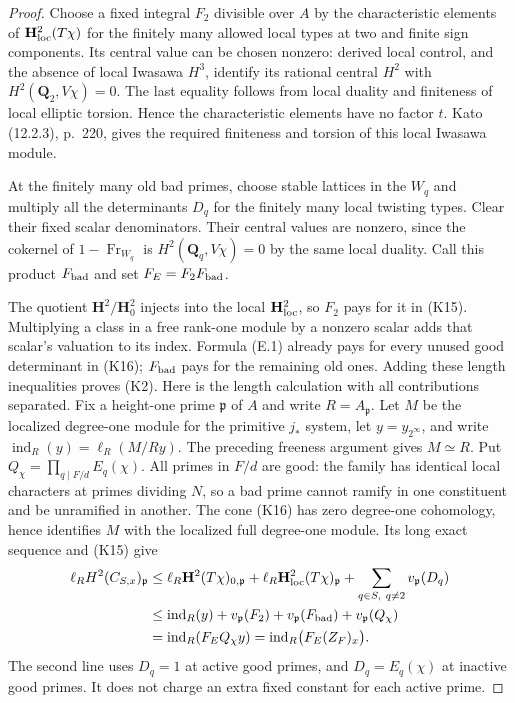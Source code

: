 \begin{proof}
Choose a fixed integral $F_2$ divisible over $A$ by the
characteristic elements of $\mathbf H^2_{\rm loc}(T\chi)$
for the finitely many allowed local types at two and finite
sign components. Its central value can be chosen nonzero:
derived local control, and the absence of local Iwasawa $H^3$,
identify its rational central $H^2$ with $H^2(\mathbf Q_2,V\chi)=0$.
The last equality follows from local duality and finiteness of
local elliptic torsion. Hence the characteristic elements have
no factor $t$. Kato (12.2.3), p.~220, gives the required finiteness
and torsion of this local Iwasawa module.

At the finitely many old bad primes, choose stable lattices in
the $W_q$ and multiply all the determinants $D_q$ for the finitely
many local twisting types. Clear their fixed scalar denominators.
Their central values are nonzero, since the cokernel of
$1-\operatorname{Fr}_{W_q}$ is $H^2(\mathbf Q_q,V\chi)=0$
by the same local duality. Call this product $F_{\rm bad}$ and set
$F_E=F_2F_{\rm bad}$.

The quotient $\mathbf H^2/\mathbf H^2_0$ injects into the local
$\mathbf H^2_{\rm loc}$, so $F_2$ pays for it in (K15).
Multiplying a class in a free rank-one module by a nonzero scalar
adds that scalar's valuation to its index. Formula (E.1) already
pays for every unused good determinant in (K16); $F_{\rm bad}$
pays for the remaining old ones. Adding these length inequalities
proves (K2).
Here is the length calculation with all contributions separated.
Fix a height-one prime $\mathfrak p$ of $A$ and write
$R=A_{\mathfrak p}$. Let $M$ be the localized degree-one module
for the primitive $j_*$ system, let $y=y_{2^\infty}$, and write
$\operatorname{ind}_R(y)=\ell_R(M/Ry)$.
The preceding freeness argument gives $M\simeq R$.
Put $Q_\chi=\prod_{q\mid F/d}E_q(\chi)$.
All primes in $F/d$ are good: the family has identical local
characters at primes dividing $N$, so a bad prime cannot ramify
in one constituent and be unramified in another.
The cone (K16) has zero degree-one cohomology, hence identifies
$M$ with the localized full degree-one module. Its long exact
sequence and (K15) give
\[
\begin{split}
 \ell_R H^2(C_{S,x})_{\mathfrak p}
 &\le \ell_R\mathbf H^2(T\chi)_{0,\mathfrak p}
       +\ell_R\mathbf H^2_{\rm loc}(T\chi)_{\mathfrak p}
       +\sum_{q\in S,\ q\ne2}v_{\mathfrak p}(D_q)\\
 &\le \operatorname{ind}_R(y)
       +v_{\mathfrak p}(F_2)+v_{\mathfrak p}(F_{\rm bad})
       +v_{\mathfrak p}(Q_\chi)\\
 &=\operatorname{ind}_R(F_EQ_\chi y)
  =\operatorname{ind}_R\bigl(F_E(Z_F)_x\bigr).
\end{split}
\]
The second line uses $D_q=1$ at active good primes, and
$D_q=E_q(\chi)$ at inactive good primes. It does not charge an
extra fixed constant for each active prime.


\end{proof}
